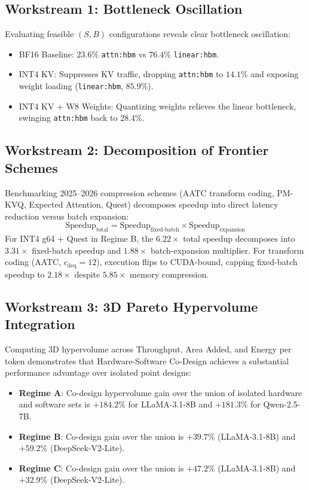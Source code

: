 \documentclass[conference,onecolumn]{IEEEtran}
\begin{document}
\subsection{Workstream 1: Bottleneck Oscillation}
Evaluating feasible $(S, B)$ configurations reveals clear bottleneck oscillation:
\begin{itemize}
    \item BF16 Baseline: $23.6\%$ \texttt{attn:hbm} vs $76.4\%$ \texttt{linear:hbm}.
    \item INT4 KV: Suppresses KV traffic, dropping \texttt{attn:hbm} to $14.1\%$ and exposing weight loading (\texttt{linear:hbm}, $85.9\%$).
    \item INT4 KV + W8 Weights: Quantizing weights relieves the linear bottleneck, swinging \texttt{attn:hbm} back to $28.4\%$.
\end{itemize}

\subsection{Workstream 2: Decomposition of Frontier Schemes}
Benchmarking 2025--2026 compression schemes (AATC transform coding, PM-KVQ, Expected Attention, Quest) decomposes speedup into direct latency reduction versus batch expansion:
\begin{equation}
\text{Speedup}_{\text{total}} = \text{Speedup}_{\text{fixed-batch}} \times \text{Speedup}_{\text{expansion}}
\end{equation}
For INT4 g64 + Quest in Regime B, the $6.22\times$ total speedup decomposes into $3.31\times$ fixed-batch speedup and $1.88\times$ batch-expansion multiplier. For transform coding (AATC, $c_{\text{deq}} = 12$), execution flips to CUDA-bound, capping fixed-batch speedup to $2.18\times$ despite $5.85\times$ memory compression.

\subsection{Workstream 3: 3D Pareto Hypervolume Integration}
Computing 3D hypervolume across Throughput, Area Added, and Energy per token demonstrates that Hardware-Software Co-Design achieves a substantial performance advantage over isolated point designs:
\begin{itemize}
    \item \textbf{Regime A}: Co-design hypervolume gain over the union of isolated hardware and software sets is $\mathbf{+184.2\%}$ for LLaMA-3.1-8B and $\mathbf{+181.3\%}$ for Qwen-2.5-7B.
    \item \textbf{Regime B}: Co-design gain over the union is $\mathbf{+39.7\%}$ (LLaMA-3.1-8B) and $\mathbf{+59.2\%}$ (DeepSeek-V2-Lite).
    \item \textbf{Regime C}: Co-design gain over the union is $\mathbf{+47.2\%}$ (LLaMA-3.1-8B) and $\mathbf{+32.9\%}$ (DeepSeek-V2-Lite).
\end{itemize}
\end{document}
